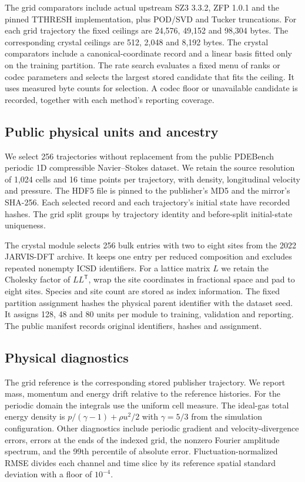 \documentclass[10pt,a4paper,twocolumn]{article}
\begin{document}
The grid comparators include actual upstream SZ3 3.3.2, ZFP 1.0.1 and the pinned TTHRESH implementation, plus POD/SVD and Tucker truncations.\cite{sz3,lindstrom,tthresh,sirovich,tucker} For each grid trajectory the fixed ceilings are 24,576, 49,152 and 98,304 bytes. The corresponding crystal ceilings are 512, 2,048 and 8,192 bytes. The crystal comparators include a canonical-coordinate record and a linear basis fitted only on the training partition. The rate search evaluates a fixed menu of ranks or codec parameters and selects the largest stored candidate that fits the ceiling. It uses measured byte counts for selection. A codec floor or unavailable candidate is recorded, together with each method's reporting coverage.

\subsection{Public physical units and ancestry}
We select 256 trajectories without replacement from the public PDEBench periodic 1D compressible Navier--Stokes dataset.\cite{pdebench,pdedata} We retain the source resolution of 1,024 cells and 16 time points per trajectory, with density, longitudinal velocity and pressure. The HDF5 file is pinned to the publisher's MD5 and the mirror's SHA-256. Each selected record and each trajectory's initial state have recorded hashes. The grid split groups by trajectory identity and before-split initial-state uniqueness.

The crystal module selects 256 bulk entries with two to eight sites from the 2022 JARVIS-DFT archive.\cite{jarvis,jarvisdata} It keeps one entry per reduced composition and excludes repeated nonempty ICSD identifiers. For a lattice matrix $L$ we retain the Cholesky factor of $LL^{\mathsf T}$, wrap the site coordinates in fractional space and pad to eight sites. Species and site count are stored as index information. The fixed partition assignment hashes the physical parent identifier with the dataset seed. It assigns 128, 48 and 80 units per module to training, validation and reporting. The public manifest records original identifiers, hashes and assignment.

\subsection{Physical diagnostics}
The grid reference is the corresponding stored publisher trajectory. We report mass, momentum and energy drift relative to the reference histories. For the periodic domain the integrals use the uniform cell measure. The ideal-gas total energy density is $p/(\gamma-1)+\rho u^2/2$ with $\gamma=5/3$ from the simulation configuration. Other diagnostics include periodic gradient and velocity-divergence errors, errors at the ends of the indexed grid, the nonzero Fourier amplitude spectrum, and the 99th percentile of absolute error. Fluctuation-normalized RMSE divides each channel and time slice by its reference spatial standard deviation with a floor of $10^{-4}$.
\end{document}
